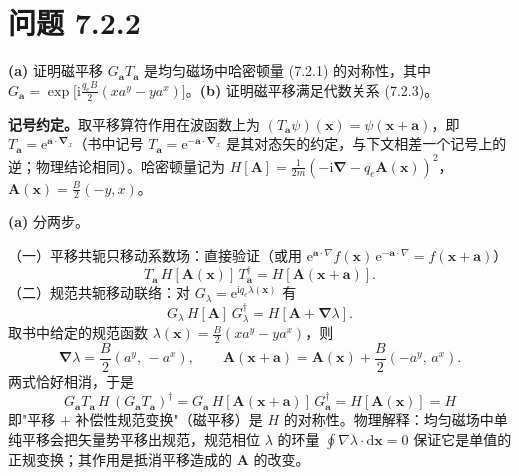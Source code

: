 \section*{问题 7.2.2}
\begin{problem}
\textbf{(a)} 证明磁平移 $G_{\pmb{a}}T_{\pmb{a}}$ 是均匀磁场中哈密顿量 (7.2.1) 的对称性，其中 $G_{\pmb{a}}=\exp\big[\mathrm{i}\frac{q_eB}{2}(xa^y-ya^x)\big]$。\textbf{(b)} 证明磁平移满足代数关系 (7.2.3)。
\end{problem}
\solution
\textbf{记号约定。}取平移算符作用在波函数上为 $(T_{\pmb{a}}\psi)(\pmb{x})=\psi(\pmb{x}+\pmb{a})$，即 $T_{\pmb{a}}=\mathrm{e}^{\pmb{a}\cdot\pmb{\nabla}_{\!x}}$（书中记号 $T_{\pmb{a}}=\mathrm{e}^{-\pmb{a}\cdot\pmb{\nabla}_x}$ 是其对态矢的约定，与下文相差一个记号上的逆；物理结论相同）。哈密顿量记为 $H[\pmb{A}]=\frac{1}{2m}(-\mathrm{i}\pmb{\nabla}-q_e\pmb{A}(\pmb{x}))^2$，$\pmb{A}(\pmb{x})=\frac{B}{2}(-y,x)$。

\textbf{(a)} 分两步。

（一）平移共轭只移动系数场：直接验证（或用 $\mathrm{e}^{\pmb{a}\cdot\nabla}f(\pmb{x})\,\mathrm{e}^{-\pmb{a}\cdot\nabla}=f(\pmb{x}+\pmb{a})$）
\begin{equation*}
T_{\pmb{a}}\,H[\pmb{A}(\pmb{x})]\,T_{\pmb{a}}^{\dagger}=H[\pmb{A}(\pmb{x}+\pmb{a})].
\end{equation*}
（二）规范共轭移动联络：对 $G_\lambda=\mathrm{e}^{\mathrm{i}q_e\lambda(\pmb{x})}$ 有
\begin{equation*}
G_\lambda\,H[\pmb{A}]\,G_\lambda^{\dagger}=H[\pmb{A}+\pmb{\nabla}\lambda].
\end{equation*}
取书中给定的规范函数 $\lambda(\pmb{x})=\frac{B}{2}(xa^y-ya^x)$，则
\begin{equation*}
\pmb{\nabla}\lambda=\frac{B}{2}(a^y,\,-a^x),
\qquad
\pmb{A}(\pmb{x}+\pmb{a})=\pmb{A}(\pmb{x})+\frac{B}{2}(-a^y,\,a^x).
\end{equation*}
两式恰好相消，于是
\begin{equation*}
\boxed{\;G_{\pmb{a}}T_{\pmb{a}}\,H\,(G_{\pmb{a}}T_{\pmb{a}})^{\dagger}
=G_{\pmb{a}}\,H[\pmb{A}(\pmb{x}+\pmb{a})]\,G_{\pmb{a}}^{\dagger}
=H[\pmb{A}(\pmb{x})]=H\;}
\end{equation*}
即"平移 $+$ 补偿性规范变换"（磁平移）是 $H$ 的对称性。物理解释：均匀磁场中单纯平移会把矢量势平移出规范，规范相位 $\lambda$ 的环量 $\oint\nabla\lambda\cdot\mathrm{d}\pmb{x}=0$ 保证它是单值的正规变换；其作用是抵消平移造成的 $\pmb{A}$ 的改变。

